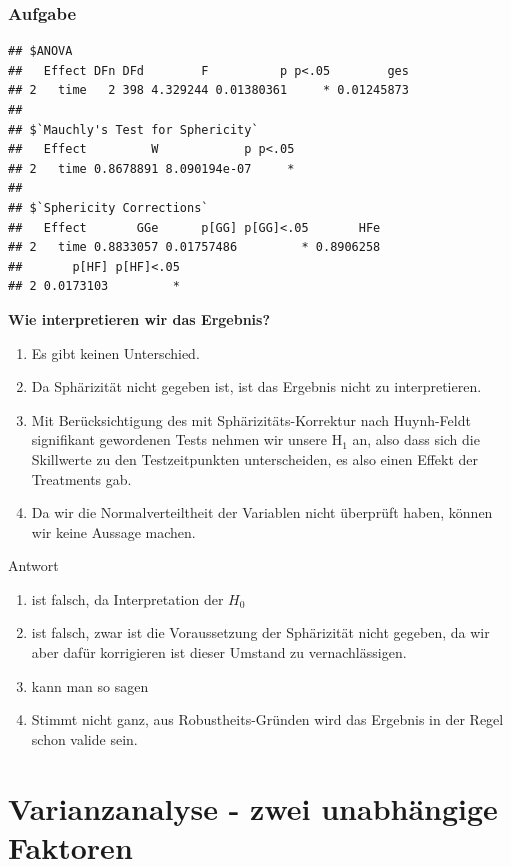 \documentclass[
]{book}
\begin{document}
\hypertarget{aufgabe-9}{%
\subsubsection{Aufgabe}\label{aufgabe-9}}

\begin{verbatim}
## $ANOVA
##   Effect DFn DFd        F          p p<.05        ges
## 2   time   2 398 4.329244 0.01380361     * 0.01245873
## 
## $`Mauchly's Test for Sphericity`
##   Effect         W            p p<.05
## 2   time 0.8678891 8.090194e-07     *
## 
## $`Sphericity Corrections`
##   Effect       GGe      p[GG] p[GG]<.05       HFe
## 2   time 0.8833057 0.01757486         * 0.8906258
##       p[HF] p[HF]<.05
## 2 0.0173103         *
\end{verbatim}

\textbf{Wie interpretieren wir das Ergebnis?}

\begin{enumerate}
\def\labelenumi{\arabic{enumi}.}
\item
  Es gibt keinen Unterschied.
\item
  Da Sphärizität nicht gegeben ist, ist das Ergebnis nicht zu interpretieren.
\item
  Mit Berücksichtigung des mit Sphärizitäts-Korrektur nach Huynh-Feldt signifikant gewordenen Tests nehmen wir unsere \(\text{H}_1\) an, also dass sich die Skillwerte zu den Testzeitpunkten unterscheiden, es also einen Effekt der Treatments gab.
\item
  Da wir die Normalverteiltheit der Variablen nicht überprüft haben, können wir keine Aussage machen.
\end{enumerate}

Antwort

\begin{enumerate}
\def\labelenumi{\arabic{enumi}.}
\item
  ist falsch, da Interpretation der \(H_0\)
\item
  ist falsch, zwar ist die Voraussetzung der Sphärizität nicht gegeben, da wir aber dafür korrigieren ist dieser Umstand zu vernachlässigen.
\item
  kann man so sagen
\item
  Stimmt nicht ganz, aus Robustheits-Gründen wird das Ergebnis in der Regel schon valide sein.
\end{enumerate}

\hypertarget{varianzanalyse---zwei-unabhuxe4ngige-faktoren}{%
\section{Varianzanalyse - zwei unabhängige Faktoren}\label{varianzanalyse---zwei-unabhuxe4ngige-faktoren}}
\end{document}
